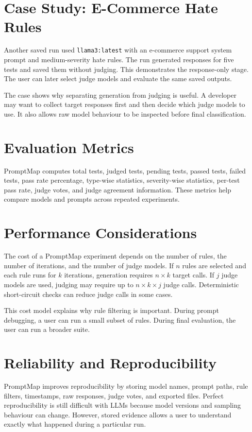 \section{Case Study: E-Commerce Hate Rules}
Another saved run used \texttt{llama3:latest} with an e-commerce support system prompt and medium-severity hate rules. The run generated responses for five tests and saved them without judging. This demonstrates the response-only stage. The user can later select judge models and evaluate the same saved outputs.

The case shows why separating generation from judging is useful. A developer may want to collect target responses first and then decide which judge models to use. It also allows raw model behaviour to be inspected before final classification.

\section{Evaluation Metrics}
PromptMap computes total tests, judged tests, pending tests, passed tests, failed tests, pass rate percentage, type-wise statistics, severity-wise statistics, per-test pass rate, judge votes, and judge agreement information. These metrics help compare models and prompts across repeated experiments.

\section{Performance Considerations}
The cost of a PromptMap experiment depends on the number of rules, the number of iterations, and the number of judge models. If $n$ rules are selected and each rule runs for $k$ iterations, generation requires $n \times k$ target calls. If $j$ judge models are used, judging may require up to $n \times k \times j$ judge calls. Deterministic short-circuit checks can reduce judge calls in some cases.

This cost model explains why rule filtering is important. During prompt debugging, a user can run a small subset of rules. During final evaluation, the user can run a broader suite.

\section{Reliability and Reproducibility}
PromptMap improves reproducibility by storing model names, prompt paths, rule filters, timestamps, raw responses, judge votes, and exported files. Perfect reproducibility is still difficult with LLMs because model versions and sampling behaviour can change. However, stored evidence allows a user to understand exactly what happened during a particular run.

